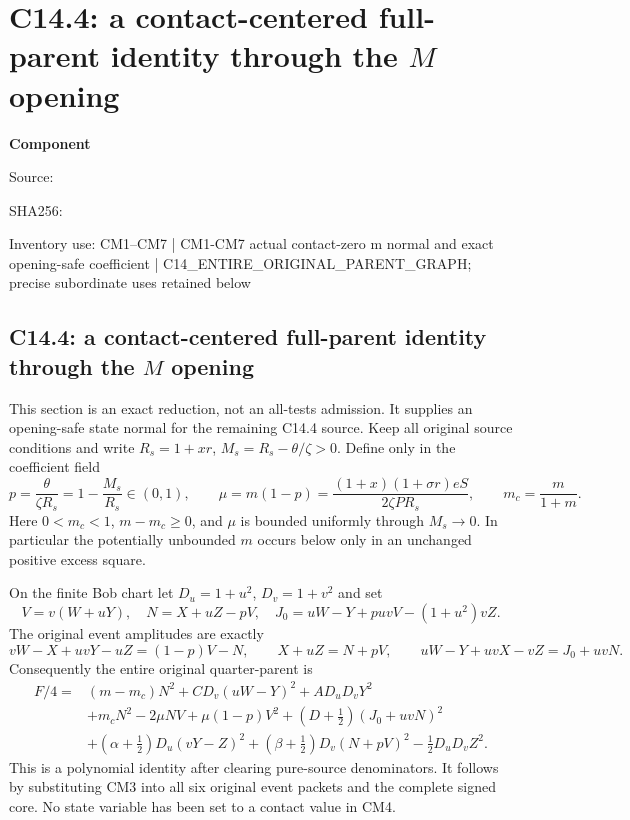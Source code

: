 \chapter{C14.4: a contact-centered full-parent identity through the $M$ opening}
\label{component:pdc67cb6181a3}
\noindent\textbf{Component }\par
{\small\noindent Source: \par}
{\small\noindent SHA256: \par}
{\small\noindent Inventory use: CM1--CM7 | CM1-CM7 actual contact-zero m normal and exact opening-safe coefficient | C14\_\allowbreak{}ENTIRE\_\allowbreak{}ORIGINAL\_\allowbreak{}PARENT\_\allowbreak{}GRAPH; precise subordinate uses retained below\par}
\medskip
\section{C14.4: a contact-centered full-parent identity through the $M$ opening}
\label{pdc67cb6181a3:sec:recovery-c144-centered-m}

This section is an exact reduction, not an all-tests admission. It supplies
an opening-safe state normal for the remaining C14.4 source. Keep all
original source conditions and write $R_s=1+xr$, $M_s=R_s-\theta/\zeta>0$.
Define only in the coefficient field
\[
 p=\frac{\theta}{\zeta R_s}=1-\frac{M_s}{R_s}\in(0,1),\qquad
 \mu=m(1-p)=\frac{(1+x)(1+\sigma r)eS}{2\zeta P R_s},\qquad
 m_c=\frac m{1+m}.
 \tag{CM1}
\]
Here $0<m_c<1$, $m-m_c\ge0$, and $\mu$ is bounded uniformly through
$M_s\to0$. In particular the potentially unbounded $m$ occurs below
only in an unchanged positive excess square.

On the finite Bob chart let $D_u=1+u^2$, $D_v=1+v^2$ and set
\[
 V=v(W+uY),\quad N=X+uZ-pV,\quad
 J_0=uW-Y+puvV-(1+u^2)vZ.\tag{CM2}
\]
The original event amplitudes are exactly
\[
 vW-X+uvY-uZ=(1-p)V-N,\qquad
 X+uZ=N+pV,\qquad
 uW-Y+uvX-vZ=J_0+uvN.\tag{CM3}
\]
Consequently the entire original quarter-parent is
\[
\begin{split}
 F/4={}&(m-m_c)N^2+C D_v(uW-Y)^2+A D_uD_vY^2\\
 &+m_cN^2-2\mu NV+\mu(1-p)V^2
 +(D+\tfrac12)(J_0+uvN)^2\\
 &+(\alpha+\tfrac12)D_u(vY-Z)^2
 +(\beta+\tfrac12)D_v(N+pV)^2-\tfrac12D_uD_vZ^2.
\end{split}\tag{CM4}
\]
This is a polynomial identity after clearing pure-source denominators.
It follows by substituting CM3 into all six original event packets and
the complete signed core. No state variable has been set to a contact
value in CM4.

